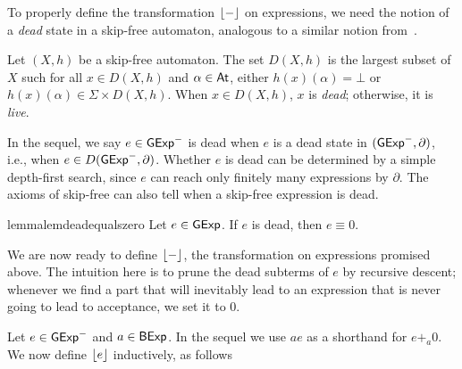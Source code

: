 \documentclass[orivec,envcountsect,envcountsame]{llncs}
\begin{document}
To properly define the transformation \(\lfloor-\rfloor\) on expressions, we need the notion of a \emph{dead} state in a skip-free automaton, analogous to a similar notion from~\cite{gkatpopl}.

\begin{definition}
Let $(X, h)$ be a skip-free automaton.
The set $D(X, h)$ is the largest subset of $X$ such for all $x \in D(X, h)$ and $\alpha \in \mathsf{At}$, either $h(x)(\alpha) = \bot$ or $h(x)(\alpha) \in \Sigma \times D(X,h)$.
When $x \in D(X, h)$, $x$ is \emph{dead}; otherwise, it is \emph{live}.
\end{definition}

In the sequel, we say $e \in \mathsf{GExp}^-$ is dead when $e$ is a dead state in $(\mathsf{GExp}^-, \partial)$, i.e., when $e \in D(\mathsf{GExp}^-, \partial)$.
Whether $e$ is dead can be determined by a simple depth-first search, since $e$ can reach only finitely many expressions by $\partial$.
The axioms of skip-free \GKAT can also tell when a skip-free expression is dead.

\begin{restatable}{lemma}{lemdeadequalszero}\label{lemma:dead-equals-zero}%
    Let $e \in \mathsf{GExp}$.
    If $e$ is dead, then $e \equiv 0$.
\end{restatable}

We are now ready to define $\lfloor-\rfloor$, the transformation on expressions promised above.
The intuition here is to prune the dead subterms of $e$ by recursive descent; whenever we find a part that will inevitably lead to an expression that is never going to lead to acceptance, we set it to $0$.

\begin{definition}
    Let $e \in \mathsf{GExp}^-$ and $a \in \mathsf{BExp}$.
    In the sequel we use $ae$ as a shorthand for $e +_a 0$.
    We now define $\lfloor e\rfloor$ inductively, as follows
\end{definition}
\end{document}
